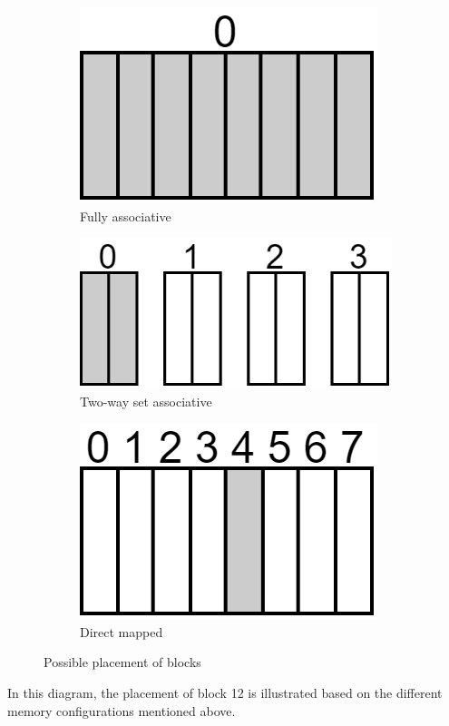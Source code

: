 \begin{figure}[H]
    \centering
    \begin{subfigure}{0.32\textwidth}
        \centering
        \includegraphics[width=0.45\linewidth]{images/fa.png} 
        \caption{Fully associative}
    \end{subfigure}
    \begin{subfigure}{0.32\textwidth}
        \centering
        \includegraphics[width=0.6\linewidth]{images/twsa.png}
        \caption{Two-way set associative}
    \end{subfigure}
    \begin{subfigure}{0.32\textwidth}
        \centering
        \includegraphics[width=0.45\linewidth]{images/dm.png}
        \caption{Direct mapped}
    \end{subfigure}
    \caption{Possible placement of blocks}
\end{figure}
In this diagram, the placement of block 12 is illustrated based on the different memory configurations mentioned above.

